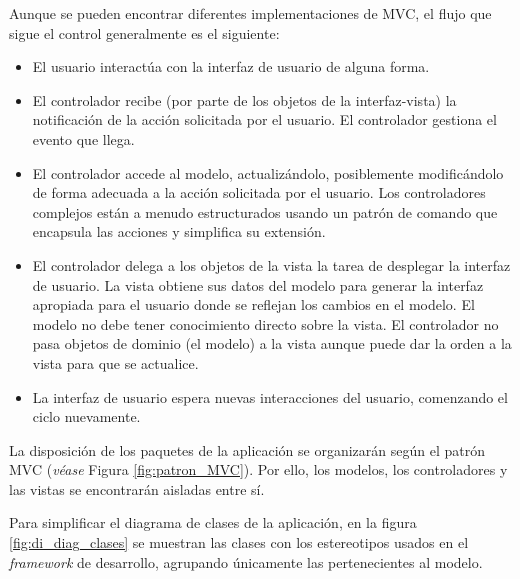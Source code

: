 			Aunque se pueden encontrar diferentes implementaciones de MVC, el flujo que sigue el control generalmente es el siguiente:
			
			\begin{itemize}
				\item El usuario interactúa con la interfaz de usuario de alguna forma.
				\item El controlador recibe (por parte de los objetos de la interfaz-vista) la notificación de la acción solicitada por el usuario. El controlador gestiona el evento que llega. 
				\item El controlador accede al modelo, actualizándolo, posiblemente modificándolo de forma adecuada a la acción solicitada por el usuario. Los controladores complejos están a menudo estructurados usando un patrón de comando que encapsula las acciones y simplifica su extensión.
				\item El controlador delega a los objetos de la vista la tarea de desplegar la interfaz de usuario. La vista obtiene sus datos del modelo para generar la interfaz apropiada para el usuario donde se reflejan los cambios en el modelo. El modelo no debe tener conocimiento directo sobre la vista. El controlador no pasa objetos de dominio (el modelo) a la vista aunque puede dar la orden a la vista para que se actualice. 
				\item La interfaz de usuario espera nuevas interacciones del usuario, comenzando el ciclo nuevamente. 
			\end{itemize}
			
			La disposición de los paquetes de la aplicación se organizarán según el patrón MVC ({\it véase} Figura \ref{fig:patron_MVC}). Por ello, los modelos, los controladores y las vistas se encontrarán aisladas entre sí.
			
			Para simplificar el diagrama de clases de la aplicación, en la figura \ref{fig:di_diag_clases} se muestran las clases con los estereotipos usados en el {\it framework} de desarrollo, agrupando únicamente las pertenecientes al modelo.
			
